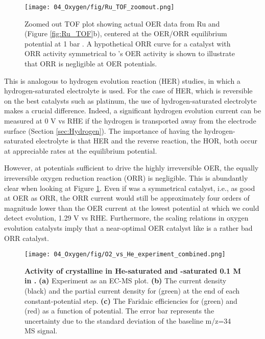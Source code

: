 \begin{figure}[h!]
	\centering
	\texttt{[image: 04\_Oxygen/fig/Ru\_TOF\_zoomout.png]}
	\caption{Zoomed out TOF plot showing actual OER data from Ru and  (Figure \ref{fig:Ru_TOF}b), centered at the OER/ORR equilibrium potential at 1 bar . A hypothetical ORR curve for a catalyst with ORR activity symmetrical to 's OER activity is shown to illustrate that ORR is negligible at OER potentials.}
	\label{fig:Ru_TOF_zoomout}
\end{figure}

This is analogous to hydrogen evolution reaction (HER) studies, in which a hydrogen-saturated electrolyte is used. For the case of HER, which is reversible on the best catalysts such as platinum, the use of hydrogen-saturated electrolyte makes a crucial difference. Indeed, a significant hydrogen evolution current can be measured at 0 V vs RHE if the hydrogen is transported away from the electrode surface (Section \ref{sec:Hydrogen}). The importance of having the hydrogen-saturated electrolyte is that HER and the reverse reaction, the HOR, both occur at appreciable rates at the equilibrium potential.

However, at potentials sufficient to drive the highly irreversible OER, the equally irreversible oxygen reduction reaction (ORR) is negligible. This is abundantly clear when looking at Figure \ref{fig:Ru_TOF_zoomout}. Even if  was a symmetrical catalyst, i.e., as good at OER as ORR, the ORR current would still be approximately four orders of magnitude lower than the OER current at the  lowest potential at which we could detect  evolution, 1.29 V vs RHE. Furthermore, the scaling relations in oxygen evolution catalysts imply that a near-optimal OER catalyst like  is a rather bad ORR catalyst\cite{Busch2016}. 

\begin{figure}[h!]
	\texttt{[image: 04\_Oxygen/fig/O2\_vs\_He\_experiment\_combined.png]}
	\caption{\textbf{Activity of crystalline  in He-saturated and -saturated 0.1 M  in .} \textbf{(a)} Experiment as an EC-MS plot. \textbf{(b)} The current density (black) and the partial current density for  (green) at the end of each constant-potential step. \textbf{(c)} The Faridaic efficiencies for  (green) and  (red) as a function of potential. The error bar represents the uncertainty due to the standard deviation of the baseline m/z=34 MS signal.}
	\label{fig:He_vs_O2}
\end{figure}

